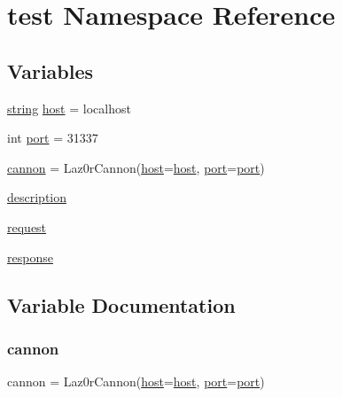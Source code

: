 \hypertarget{namespacetest}{}\section{test Namespace Reference}
\label{namespacetest}
\subsection*{Variables}
\begin{DoxyCompactItemize}
\item 
\hyperlink{string_8h_a3d2981d9da3e25dd89371059777fdd12}{string} \hyperlink{namespacetest_a832ddc04754e8a43d4f3c6165b1294a7}{host} = \textquotesingle{}localhost\textquotesingle{}
\item 
int \hyperlink{namespacetest_af8fb0f45ee0195c7422a49e6a8d72369}{port} = 31337
\item 
\hyperlink{namespacetest_ae30d93eff9f7abe93b53d216f5b998b0}{cannon} = Laz0r\+Cannon(\hyperlink{namespacetest_a832ddc04754e8a43d4f3c6165b1294a7}{host}=\hyperlink{namespacetest_a832ddc04754e8a43d4f3c6165b1294a7}{host}, \hyperlink{namespacetest_af8fb0f45ee0195c7422a49e6a8d72369}{port}=\hyperlink{namespacetest_af8fb0f45ee0195c7422a49e6a8d72369}{port})
\item 
\hyperlink{namespacetest_a2661f439a4a94ffdcd5e47ae1da0bb1d}{description}
\item 
\hyperlink{namespacetest_a51e6a0d2bcb8531a5e5adcd66a77aa3b}{request}
\item 
\hyperlink{namespacetest_a8ab7bcb35ce5bba05608c72da6b4a0d3}{response}
\end{DoxyCompactItemize}


\subsection{Variable Documentation}
\mbox{\label{namespacetest_ae30d93eff9f7abe93b53d216f5b998b0}} 
\subsubsection{\texorpdfstring{cannon}{cannon}}
{\footnotesize\ttfamily cannon = Laz0r\+Cannon(\hyperlink{namespacetest_a832ddc04754e8a43d4f3c6165b1294a7}{host}=\hyperlink{namespacetest_a832ddc04754e8a43d4f3c6165b1294a7}{host}, \hyperlink{namespacetest_af8fb0f45ee0195c7422a49e6a8d72369}{port}=\hyperlink{namespacetest_af8fb0f45ee0195c7422a49e6a8d72369}{port})}

